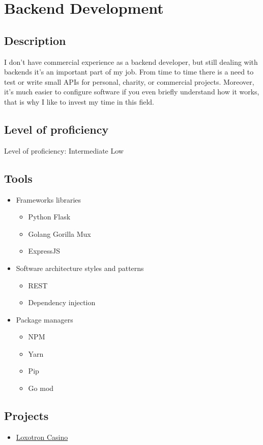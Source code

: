 \section{Backend Development}

\subsection{Description}

I don't have commercial experience as a backend developer,
but still dealing with backends it's an important part of my job.
From time to time there is a need to test or write small APIs for personal,
charity, or commercial projects. Moreover, it's much easier to configure software
if you even briefly understand how it works, that is why I like to invest my time in this field.

\subsection{Level of proficiency}

Level of proficiency: Intermediate Low

\subsection{Tools}
\begin{itemize}
    \item Frameworks libraries
    \begin{itemize}
        \item Python Flask
        \item Golang Gorilla Mux
        \item ExpressJS
    \end{itemize}

    \item Software architecture styles and patterns
    \begin{itemize}
        \item REST
        \item Dependency injection
    \end{itemize}

    \item Package managers
    \begin{itemize}
        \item NPM
        \item Yarn
        \item Pip
        \item Go mod
    \end{itemize}
\end{itemize}

\subsection{Projects}

\begin{itemize}
    \item \hyperlink{proj_loxotron}{Loxotron Casino}
\end{itemize}

\newpage
